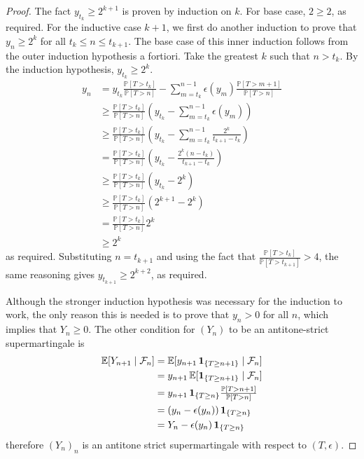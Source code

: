 \begin{proof}
The fact $y_{t_k} \geq 2^{k+1}$ is proven by induction on $k$. For base case, $2 \geq 2$, as required. For the inductive case $k+1$, we first do another induction to prove that $y_n \geq 2^k$ for all $t_k \leq n \leq t_{k+1}$. The base case of this inner induction follows from the outer induction hypothesis a fortiori. Take the greatest $k$ such that $n > t_k$. By the induction hypothesis, $y_{t_k} \geq 2^k$.
\begin{align*}
    y_n & = y_{t_k} \frac{\mathbb P[T > t_k]}{\mathbb P[T > n]} - \sum_{m=t_k}^{n-1} \epsilon(y_m) \frac{\mathbb P[T > m+1]}{\mathbb P[T > n]} \\
    & \geq \frac{\mathbb P[T > t_k]}{\mathbb P[T > n]} (y_{t_k} - \sum_{m=t_k}^{n-1} \epsilon(y_m)) \\
    & \geq \frac{\mathbb P[T > t_k]}{\mathbb P[T > n]} (y_{t_k} - \sum_{m=t_k}^{n-1} \frac{2^k}{t_{k+1}-t_k}) \\
    & = \frac{\mathbb P[T > t_k]}{\mathbb P[T > n]} (y_{t_k} - \frac{2^k (n - t_k)}{t_{k+1}-t_k}) \\
    & \geq \frac{\mathbb P[T > t_k]}{\mathbb P[T > n]} (y_{t_k} - 2^k) \\
    & \geq \frac{\mathbb P[T > t_k]}{\mathbb P[T > n]} (2^{k+1} - 2^k) \\
    & = \frac{\mathbb P[T > t_k]}{\mathbb P[T > n]} 2^k \\
    & \geq 2^k
\end{align*}
as required. Substituting $n = t_{k+1}$ and using the fact that $\frac{\mathbb P[T > t_k]}{\mathbb P[T > t_{k+1}]} > 4$, the same reasoning gives $y_{t_{k+1}} \geq 2^{k+2}$, as required.

Although the stronger induction hypothesis was necessary for the induction to work, the only reason this is needed is to prove that $y_n > 0$ for all $n$, which implies that $Y_n \geq 0$. 
The other condition for $(Y_n)$ to be an antitone-strict supermartingale is
\begin{align*}
    \mathbb{E}[Y_{n+1} \mid \mathcal F_n] 
    &=  \mathbb{E}[y_{n+1} \, {\bf 1}_{\{T \geq n+1\}} \mid \mathcal F_n] \\
    &=  y_{n+1} \, \mathbb{E}[{\bf 1}_{\{T \geq n+1\}} \mid \mathcal F_n] \\ 
    &=  y_{n+1} \, {\bf 1}_{\{T \geq n\}} \textstyle \frac{\mathbb P[T > n+1]}{\mathbb P[T > n]} \\
    &=  (y_n - \epsilon(y_n)) \, {\bf 1}_{\{T \geq n\}} \\
    &= Y_n - \epsilon(y_n) \, {\bf 1}_{\{T \geq n\}}
\end{align*}
therefore $(Y_n)_n$ is an antitone strict supermartingale with respect to $(T,\epsilon)$.
\end{proof}

